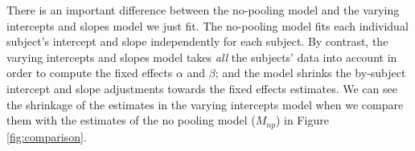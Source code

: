 \documentclass[12pt,]{krantz}
\newenvironment{Shaded}{\begin{snugshade}}{\end{snugshade}}
\newcommand{\CommentTok}[1]{\textcolor[rgb]{0.56,0.35,0.01}{\textit{#1}}}
\newcommand{\KeywordTok}[1]{\textcolor[rgb]{0.13,0.29,0.53}{\textbf{#1}}}
\newcommand{\NormalTok}[1]{#1}
\newcommand{\OperatorTok}[1]{\textcolor[rgb]{0.81,0.36,0.00}{\textbf{#1}}}
\newcommand{\StringTok}[1]{\textcolor[rgb]{0.31,0.60,0.02}{#1}}
\theoremstyle{definition}
\theoremstyle{definition}
\theoremstyle{definition}
\theoremstyle{remark}
\begin{document}
There is an important difference between the no-pooling model and the varying intercepts and slopes model we just fit. The no-pooling model fits each individual subject's intercept and slope independently for each subject. By contrast, the varying intercepts and slopes model takes \emph{all} the subjects' data into account in order to compute the fixed effects \(\alpha\) and \(\beta\); and the model shrinks the by-subject intercept and slope adjustments towards the fixed effects estimates. We can see the shrinkage of the estimates in the varying intercepts model when we compare them with the estimates of the no pooling model (\(M_{np}\)) in Figure \ref{fig:comparison}.



\begin{Shaded}
\end{Shaded}
\end{document}
